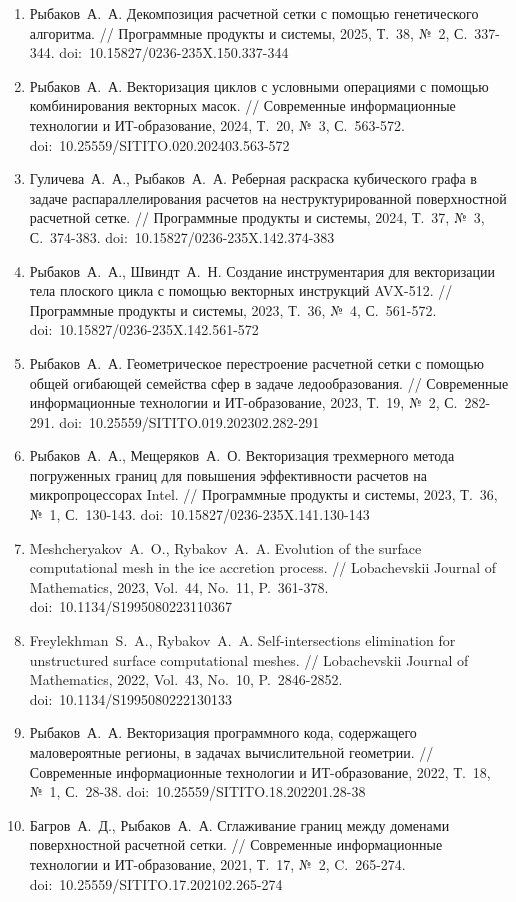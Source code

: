 \documentclass[a4paper,14pt]{extarticle}                     %
\theoremstyle{plain}                                         %
\begin{document}
\begin{enumerate}[noitemsep,topsep=0pt,parsep=0pt,partopsep=0pt]
\item Рыбаков~А.~А. Декомпозиция расчетной сетки с помощью генетического алгоритма. // Программные продукты и системы, 2025, Т.~38, №~2, С.~337-344. doi:~10.15827/0236-235X.150.337-344
\item Рыбаков~А.~А. Векторизация циклов с условными операциями с помощью комбинирования векторных масок. // Современные информационные технологии и ИТ-образование, 2024, Т.~20, №~3, С.~563-572. doi:~10.25559/SITITO.020.202403.563-572
\item Гуличева~А.~А., Рыбаков~А.~А. Реберная раскраска кубического графа в задаче распараллелирования расчетов на неструктурированной поверхностной расчетной сетке. // Программные продукты и системы, 2024, Т.~37, №~3, С.~374-383. doi:~10.15827/0236-235X.142.374-383
\item Рыбаков~А.~А., Швиндт~А.~Н. Создание инструментария для векторизации тела плоского цикла с помощью векторных инструкций AVX-512. // Программные продукты и системы, 2023, Т.~36, №~4, С.~561-572. doi:~10.15827/0236-235X.142.561-572
\item Рыбаков~А.~А. Геометрическое перестроение расчетной сетки с помощью общей огибающей семейства сфер в задаче ледообразования. // Современные информационные технологии и ИТ-образование, 2023, Т.~19, №~2, С.~282-291. doi:~10.25559/SITITO.019.202302.282-291
\item Рыбаков~А.~А., Мещеряков~А.~О. Векторизация трехмерного метода погруженных границ для повышения эффективности расчетов на микропроцессорах Intel. // Программные продукты и системы, 2023, Т.~36, №~1, С.~130-143. doi:~10.15827/0236-235X.141.130-143
\item Meshcheryakov~A.~O., Rybakov~A.~A. Evolution of the surface computational mesh in the ice accretion process. // Lobachevskii Journal of Mathematics, 2023, Vol.~44, No.~11, P.~361-378. doi:~10.1134/S1995080223110367
\item Freylekhman~S.~A., Rybakov~A.~A. Self-intersections elimination for unstruc\-tured surface computational meshes. // Lobachevskii Journal of Mathema\-tics, 2022, Vol.~43, No.~10, P.~2846-2852. doi:~10.1134/S1995080222130133
\item Рыбаков~А.~А. Векторизация программного кода, содержащего маловероятные регионы, в задачах вычислительной геометрии. // Современные информационные технологии и ИТ-образование, 2022, Т.~18, №~1, С.~28-38. doi:~10.25559/SITITO.18.202201.28-38
\item Багров~А.~Д., Рыбаков~А.~А. Сглаживание границ между доменами поверхностной расчетной сетки. // Современные информационные технологии и ИТ-образование, 2021, Т.~17, №~2, C.~265-274. \\ doi:~10.25559/SITITO.17.202102.265-274

\end{enumerate}
\end{document}
